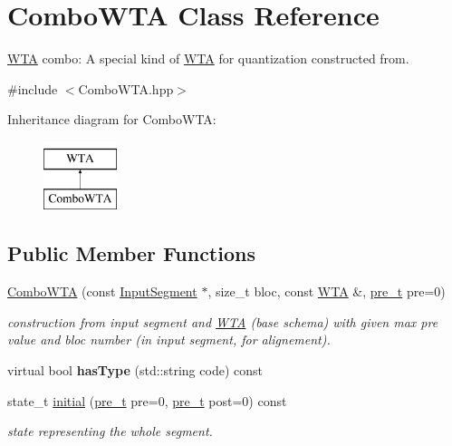\hypertarget{classComboWTA}{}\section{Combo\+W\+TA Class Reference}
\label{classComboWTA}


\mbox{\hyperlink{classWTA}{W\+TA}} combo\+: A special kind of \mbox{\hyperlink{classWTA}{W\+TA}} for quantization constructed from.  




{\ttfamily \#include $<$Combo\+W\+T\+A.\+hpp$>$}

Inheritance diagram for Combo\+W\+TA\+:\begin{figure}[H]
\begin{center}
\leavevmode
\includegraphics[height=2.000000cm]{classComboWTA}
\end{center}
\end{figure}
\subsection*{Public Member Functions}
\begin{DoxyCompactItemize}
\item 
\mbox{\hyperlink{group__schemata_ga4c589573251ec74dbe6a3c9176c39bb7}{Combo\+W\+TA}} (const \mbox{\hyperlink{classInputSegment}{Input\+Segment}} $\ast$, size\+\_\+t bloc, const \mbox{\hyperlink{classWTA}{W\+TA}} \&, \mbox{\hyperlink{group__general_ga092fe8b972dfa977c2a0886720a7731e}{pre\+\_\+t}} pre=0)
\begin{DoxyCompactList}\small\item\em construction from input segment and \mbox{\hyperlink{classWTA}{W\+TA}} (base schema) with given max pre value and bloc number (in input segment, for alignement). \end{DoxyCompactList}\item 
\mbox{\label{classComboWTA_aa55734ef06970c324a55c31c12655d0f}} 
virtual bool {\bfseries has\+Type} (std\+::string code) const
\item 
state\+\_\+t \mbox{\hyperlink{group__schemata_ga2a6c3a5867fefdac97470fd083aaa2dd}{initial}} (\mbox{\hyperlink{group__general_ga092fe8b972dfa977c2a0886720a7731e}{pre\+\_\+t}} pre=0, \mbox{\hyperlink{group__general_ga092fe8b972dfa977c2a0886720a7731e}{pre\+\_\+t}} post=0) const
\begin{DoxyCompactList}\small\item\em state representing the whole segment. \end{DoxyCompactList}\end{DoxyCompactItemize}
